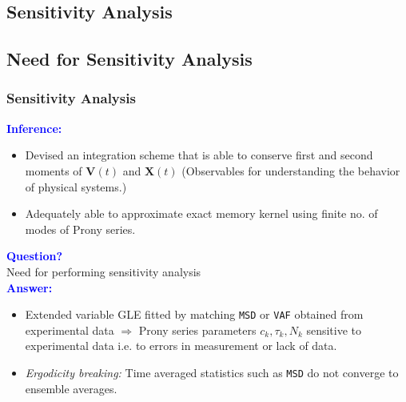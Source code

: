 \documentclass[a4paper,10pt]{beamer}
\newcommand{\BS}[1]{\boldsymbol{#1}}
\begin{document}
	\begin{frame}
		\section{Sensitivity Analysis}
		\subsection{Need for Sensitivity Analysis}
		\frametitle{Sensitivity Analysis}
		\textcolor{blue}{\textbf{Inference:}}
		\begin{itemize}
			\item {Devised an integration scheme that is able to conserve first and second moments of $\BS{V}(t)$ and $\BS{X}(t)$ (Observables for understanding the behavior of physical systems.)}
			\item {Adequately able to approximate exact memory kernel using finite no. of modes of Prony series.}
		\end{itemize}
		\textcolor{blue}{\textbf{Question?}} \\ Need for performing sensitivity analysis \vspace{0.2cm} \\
		\textcolor{blue}{\textbf{Answer:}} \\
		\begin{itemize}
			\item {Extended variable GLE fitted by matching \texttt{MSD} or \texttt{VAF} obtained from experimental data $\Rightarrow$ Prony series parameters $c_{k},\tau_{k},N_{k}$ sensitive to experimental data i.e. to errors in measurement or lack of data.}
			\item {\textit{Ergodicity breaking:} Time averaged statistics such as \texttt{MSD} do not converge to ensemble averages.}
		\end{itemize}
	\end{frame}
\end{document}
